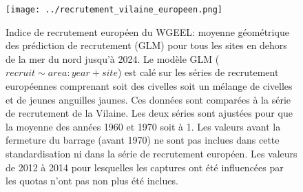 \documentclass[10pt,twocolumn,titlepage,twoside]{article}\usepackage[]{graphicx}\usepackage[]{xcolor}
\begin{document}
\begin{figure}[htpb]
\centering
\texttt{[image: ../recrutement\_vilaine\_europeen.png]}
\caption{Indice de recrutement européen du WGEEL: moyenne géométrique des
prédiction de recrutement (GLM) pour tous les sites en dehors de la mer du nord
jusqu'à 2024. Le modèle GLM ($recruit \sim area:year+site$) est calé sur
les séries de recrutement européennes comprenant soit des civelles soit un
mélange de civelles et de jeunes anguilles jaunes. Ces données sont comparées à la
  série de recrutement de la Vilaine. Les deux séries sont
  ajustées pour que la moyenne des années 1960 et 1970 soit à 1. Les valeurs avant la fermeture du barrage 
  (avant 1970) ne sont pas inclues dans cette standardisation ni dans la série de
  recrutement européen. Les valeurs de 2012 à 2014 pour lesquelles les captures
  ont été influencées par les quotas n'ont pas non plus été inclues.}
\label{figure_recrutement}
\end{figure}
\clearpage

\clearpage
\end{document}
